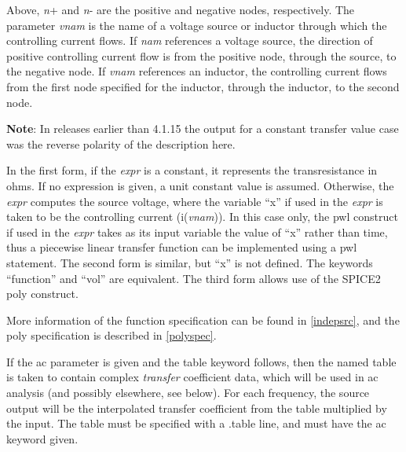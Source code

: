 
Above, {\it n\/}{\vt +} and {\it n\/}{\vt -} are the positive and
negative nodes, respectively.  The parameter {\it vnam} is the name
of a voltage source or inductor through which the controlling current
flows.  If {\it nam} references a voltage source, the direction of
positive controlling current flow is from the positive node, through
the source, to the negative node.  If {\it vnam\/} references an
inductor, the controlling current flows from the first node specified
for the inductor, through the inductor, to the second node.

{\bf Note}:  In releases earlier than 4.1.15 the output for a constant
transfer value case was the reverse polarity of the description here.

In the first form, if the {\it expr} is a constant, it represents the
transresistance in ohms.  If no expression is given, a unit constant
value is assumed.  Otherwise, the {\it expr} computes the source
voltage, where the variable ``{\vt x}'' if used in the {\it expr} is
taken to be the controlling current (i({\it vnam\/})).  In this case
only, the {\vt pwl} construct if used in the {\it expr} takes as its
input variable the value of ``{\vt x}'' rather than time, thus a
piecewise linear transfer function can be implemented using a {\vt
pwl} statement.  The second form is similar, but ``{\vt x}'' is not
defined.  The keywords ``{\vt function}'' and ``{\vt vol}'' are
equivalent.  The third form allows use of the SPICE2 {\vt poly}
construct.

More information of the function specification can be found in
\ref{indepsrc}, and the {\vt poly} specification is described in
\ref{polyspec}.

If the {\vt ac} parameter is given and the {\vt table} keyword
follows, then the named table is taken to contain complex {\it
transfer} coefficient data, which will be used in ac analysis (and
possibly elsewhere, see below).  For each frequency, the source output
will be the interpolated transfer coefficient from the table
multiplied by the input.  The table must be specified with a {\vt
.table} line, and must have the {\vt ac} keyword given.

